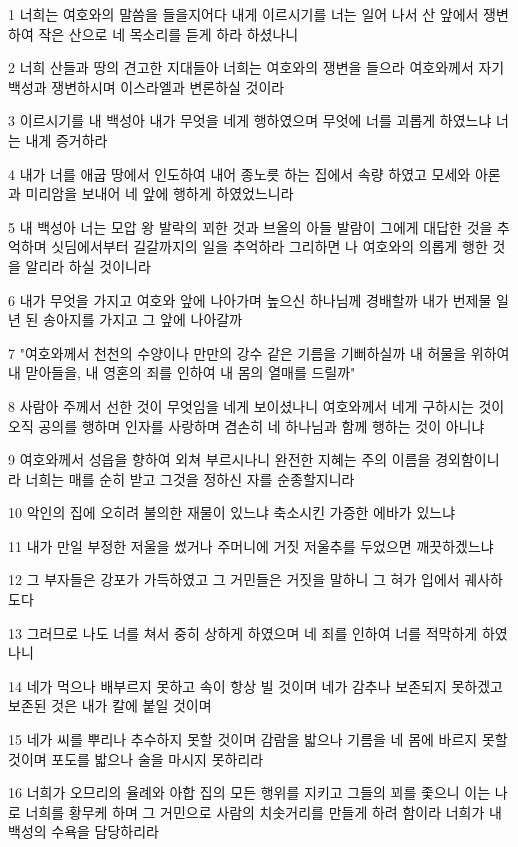 \par 1 너희는 여호와의 말씀을 들을지어다 내게 이르시기를 너는 일어 나서 산 앞에서 쟁변하여 작은 산으로 네 목소리를 듣게 하라 하셨나니
\par 2 너희 산들과 땅의 견고한 지대들아 너희는 여호와의 쟁변을 들으라 여호와께서 자기 백성과 쟁변하시며 이스라엘과 변론하실 것이라
\par 3 이르시기를 내 백성아 내가 무엇을 네게 행하였으며 무엇에 너를 괴롭게 하였느냐 너는 내게 증거하라
\par 4 내가 너를 애굽 땅에서 인도하여 내어 종노릇 하는 집에서 속량 하였고 모세와 아론과 미리암을 보내어 네 앞에 행하게 하였었느니라
\par 5 내 백성아 너는 모압 왕 발락의 꾀한 것과 브올의 아들 발람이 그에게 대답한 것을 추억하며 싯딤에서부터 길갈까지의 일을 추억하라 그리하면 나 여호와의 의롭게 행한 것을 알리라 하실 것이니라
\par 6 내가 무엇을 가지고 여호와 앞에 나아가며 높으신 하나님께 경배할까 내가 번제물 일년 된 송아지를 가지고 그 앞에 나아갈까
\par 7 "여호와께서 천천의 수양이나 만만의 강수 같은 기름을 기뻐하실까 내 허물을 위하여 내 맏아들을, 내 영혼의 죄를 인하여 내 몸의 열매를 드릴까"
\par 8 사람아 주께서 선한 것이 무엇임을 네게 보이셨나니 여호와께서 네게 구하시는 것이 오직 공의를 행하며 인자를 사랑하며 겸손히 네 하나님과 함께 행하는 것이 아니냐
\par 9 여호와께서 성읍을 향하여 외쳐 부르시나니 완전한 지혜는 주의 이름을 경외함이니라 너희는 매를 순히 받고 그것을 정하신 자를 순종할지니라
\par 10 악인의 집에 오히려 불의한 재물이 있느냐 축소시킨 가증한 에바가 있느냐
\par 11 내가 만일 부정한 저울을 썼거나 주머니에 거짓 저울추를 두었으면 깨끗하겠느냐
\par 12 그 부자들은 강포가 가득하였고 그 거민들은 거짓을 말하니 그 혀가 입에서 궤사하도다
\par 13 그러므로 나도 너를 쳐서 중히 상하게 하였으며 네 죄를 인하여 너를 적막하게 하였나니
\par 14 네가 먹으나 배부르지 못하고 속이 항상 빌 것이며 네가 감추나 보존되지 못하겠고 보존된 것은 내가 칼에 붙일 것이며
\par 15 네가 씨를 뿌리나 추수하지 못할 것이며 감람을 밟으나 기름을 네 몸에 바르지 못할 것이며 포도를 밟으나 술을 마시지 못하리라
\par 16 너희가 오므리의 율례와 아합 집의 모든 행위를 지키고 그들의 꾀를 좇으니 이는 나로 너희를 황무케 하며 그 거민으로 사람의 치솟거리를 만들게 하려 함이라 너희가 내 백성의 수욕을 담당하리라

